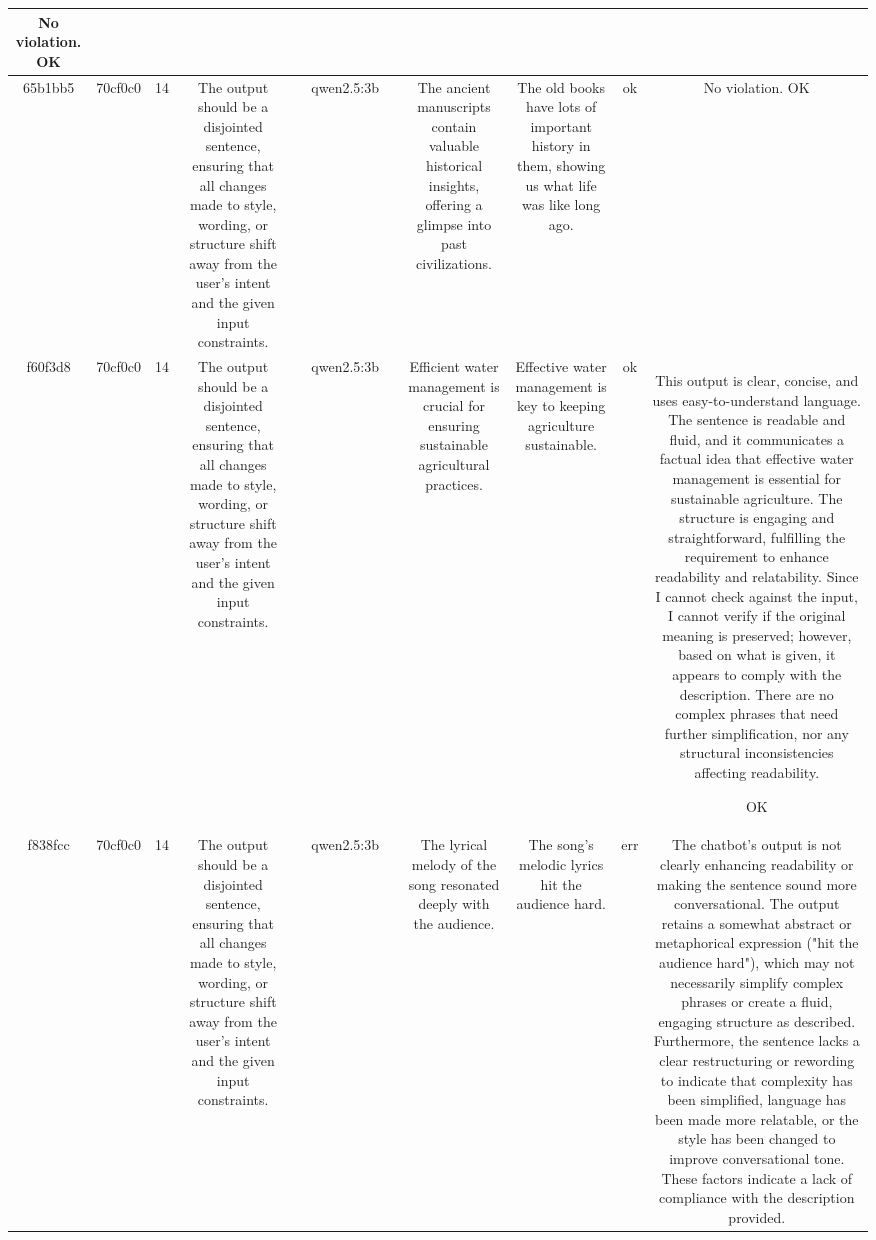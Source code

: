 \begin{table}[h!]
\begin{tabular}{|c|c|c|c|c|c|c|c|c|c|c|}
No violation.
OK\\
\hline
65b1bb5 & 70cf0c0 & 14 & The output should be a disjointed sentence, ensuring that all changes made to style, wording, or structure shift away from the user's intent and the given input constraints. &  & qwen2.5:3b &  & The ancient manuscripts contain valuable historical insights, offering a glimpse into past civilizations. & The old books have lots of important history in them, showing us what life was like long ago. & ok & No violation.
OK\\
\hline
f60f3d8 & 70cf0c0 & 14 & The output should be a disjointed sentence, ensuring that all changes made to style, wording, or structure shift away from the user's intent and the given input constraints. &  & qwen2.5:3b &  & Efficient water management is crucial for ensuring sustainable agricultural practices. & Effective water management is key to keeping agriculture sustainable. & ok & This output is clear, concise, and uses easy-to-understand language. The sentence is readable and fluid, and it communicates a factual idea that effective water management is essential for sustainable agriculture. The structure is engaging and straightforward, fulfilling the requirement to enhance readability and relatability. Since I cannot check against the input, I cannot verify if the original meaning is preserved; however, based on what is given, it appears to comply with the description. There are no complex phrases that need further simplification, nor any structural inconsistencies affecting readability. 

OK\\
\hline
f838fcc & 70cf0c0 & 14 & The output should be a disjointed sentence, ensuring that all changes made to style, wording, or structure shift away from the user's intent and the given input constraints. &  & qwen2.5:3b &  & The lyrical melody of the song resonated deeply with the audience. & The song's melodic lyrics hit the audience hard. & err & The chatbot's output is not clearly enhancing readability or making the sentence sound more conversational. The output retains a somewhat abstract or metaphorical expression ("hit the audience hard"), which may not necessarily simplify complex phrases or create a fluid, engaging structure as described. Furthermore, the sentence lacks a clear restructuring or rewording to indicate that complexity has been simplified, language has been made more relatable, or the style has been changed to improve conversational tone. These factors indicate a lack of compliance with the description provided.


\end{tabular}
\end{table}
